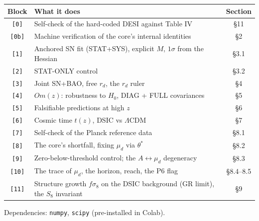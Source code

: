 \documentclass[a4paper,10pt]{article}
\begin{document}
\begin{table}[htbp]
\centering
\small
\begin{tabular}{@{}clc@{}}
\toprule
\textbf{Block} & \textbf{What it does} & \textbf{Section} \\
\midrule
\texttt{[0]} & Self-check of the hard-coded DESI against Table IV & \S11 \\
\texttt{[0b]} & Machine verification of the core's internal identities & \S2 \\
\texttt{[1]} & Anchored SN fit (STAT+SYS), explicit $M$, $1\sigma$ from the Hessian & \S3.1 \\
\texttt{[2]} & STAT-ONLY control & \S3.2 \\
\texttt{[3]} & Joint SN+BAO, free $r_d$, the $r_d$ ruler & \S4 \\
\texttt{[4]} & $Om(z)$: robustness to $H_0$, DIAG + FULL covariances & \S5 \\
\texttt{[5]} & Falsifiable predictions at high $z$ & \S6 \\
\texttt{[6]} & Cosmic time $t(z)$, DSIC vs $\Lambda$CDM & \S7 \\
\texttt{[7]} & Self-check of the Planck reference data & \S8.1 \\
\texttt{[8]} & The core's shortfall, fixing $\mu_d$ via $\theta^*$ & \S8.2 \\
\texttt{[9]} & Zero-below-threshold control; the $A \leftrightarrow \mu_d$ degeneracy & \S8.3 \\
\texttt{[10]} & The trace of $\mu_d$, the horizon, reach, the P6 flag & \S8.4--8.5 \\
\texttt{[11]} & Structure growth $f\sigma_8$ on the DSIC background (GR limit), the $S_8$ invariant & \S9 \\
\bottomrule
\end{tabular}
\end{table}

Dependencies: \texttt{numpy}, \texttt{scipy} (pre-installed in Colab).
\end{document}

